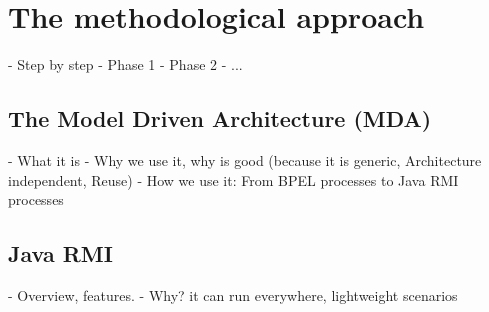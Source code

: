 
\section{The methodological approach}
- Step by step \nl
- Phase 1 \nl
- Phase 2 \nl 
- ... \nl







\subsection{The Model Driven Architecture (MDA)}
- What it is \nl
- Why we use it, why is good (because it is generic, Architecture independent, Reuse)  \nl
- How we use it: From BPEL processes to Java RMI processes \nl
\subsection{Java RMI}
- Overview, features.
- Why? it can run everywhere, lightweight scenarios  \nl

